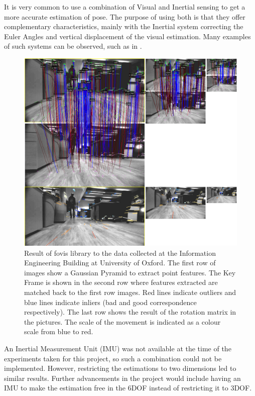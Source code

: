 \documentclass[12pt]{article}
\begin{document}
It is very common to use a combination of Visual and Inertial sensing to get a more accurate estimation of pose. The purpose of using both is that they offer complementary characteristics, mainly with the Inertial system correcting the Euler Angles and vertical displacement of the visual estimation. Many examples of such systems can be observed, such as in \cite{usenko2016direct}.
	
\begin{figure}
\begin{minipage}{0.65\textwidth}
\centering
\includegraphics[width=\textwidth]{VisualOdometry1}
\end{minipage} \hfill
\begin{minipage}{0.35\textwidth}
\centering
\caption[t]{Result of fovis library to the data collected at the Information Engineering Building at University of Oxford. The first row of images show a Gaussian Pyramid to extract point features. The Key Frame is shown in the second row where features extracted are matched back to the first row images. Red lines indicate outliers and blue lines indicate inliers (bad and good correspondence respectively). The last row shows the result of the rotation matrix in the pictures. The scale of the movement is indicated as a colour scale from blue to red.}
\label{fig:VisualOdometry1}	
\end{minipage}				
\end{figure}
		
An Inertial Measurement Unit (IMU) was not available at the time of the experiments taken for this project, so such a combination could not be implemented. However, restricting the estimations to two dimensions led to similar results. Further advancements in the project would include having an IMU to make the estimation free in the 6DOF instead of restricting it to 3DOF.
	
\end{document}
